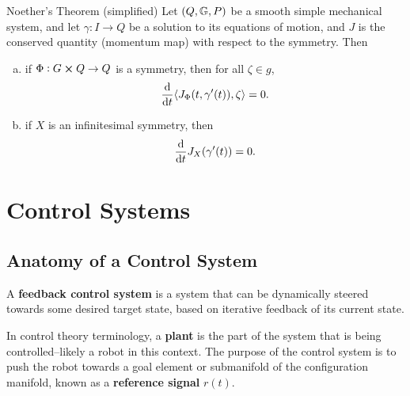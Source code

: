 \documentclass[main.tex]{subfiles}
\begin{document}
\begin{boxthm}{Noether's Theorem (simplified) \cite{bullo2019geometric}%
}
Let $\del{Q,\mbbg,P}$ be a smooth simple mechanical system, and let $\gamma:I\to Q$ be a solution to its equations of motion, and $J$ is the conserved quantity (momentum map) with respect to the symmetry. Then
\begin{enumerate}[(a)]
    \item if $\Phi:G\cross Q\to Q$ is a symmetry, then for all $\zeta\in g$,
    \begin{align}
        \dv{}{t}\langle J_\Phi(t,\gamma'(t)),\zeta\rangle
        =
        0.
    \end{align}
    \item  if $X$ is an infinitesimal symmetry, then
    \begin{align}
        \dv{}{t} J_X(\gamma'(t))
        =
        0.
    \end{align}
\end{enumerate}
\end{boxthm}


\section{Control Systems}
\subsection{Anatomy of a Control System}
A \textbf{feedback control system} is a system that can be dynamically steered towards some desired target state, based on iterative feedback of its current state\cite{franklin2002feedback}.

In control theory terminology, a \textbf{plant} is the part of the system that is being controlled--likely a robot in this context. The purpose of the control system is to push the robot towards a goal element or submanifold of the configuration manifold, known as a \textbf{reference signal} $r(t)$.
\end{document}
